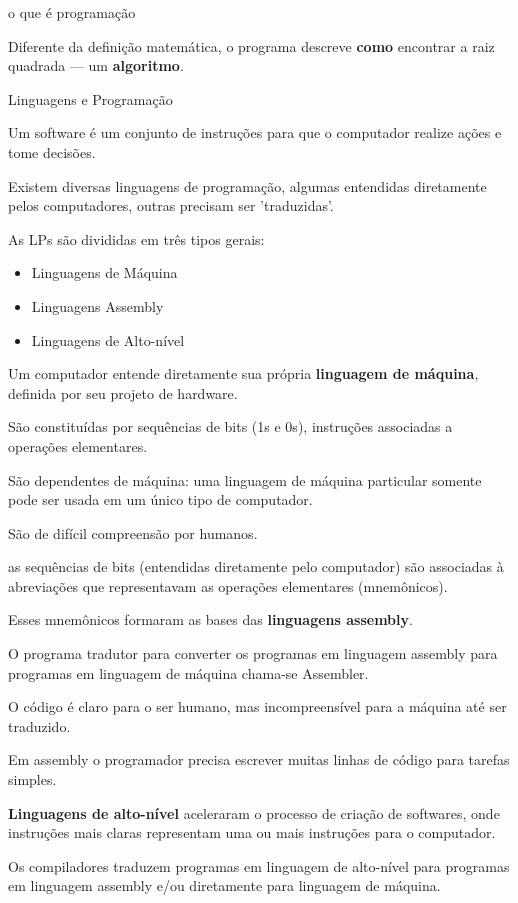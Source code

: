 \documentclass{beamer}
\begin{document}
\begin{frame}[allowframebreaks]{o que é programação}
  \framebreak

  

  Diferente da definição matemática, o programa descreve \textbf{como}
  encontrar a raiz quadrada --- um \textbf{algoritmo}.
  
\end{frame}


\begin{frame}[allowframebreaks]{Linguagens e Programação}

  Um software é um conjunto de instruções para que o computador
  realize ações e tome decisões.

  Existem diversas linguagens de programação, algumas entendidas
  diretamente pelos computadores, outras precisam ser 'traduzidas'.

  As LPs são divididas em três tipos gerais:
  
  \begin{itemize}
  \item Linguagens de Máquina
  \item Linguagens Assembly
  \item Linguagens de Alto-nível
  \end{itemize}

  \framebreak
  
  Um computador entende diretamente sua própria \textbf{linguagem de
    máquina}, definida por seu projeto de hardware.
  
  São constituídas por sequências de bits (1s e 0s), instruções
  associadas a operações elementares.
  
  São dependentes de máquina: uma linguagem de máquina particular
  somente pode ser usada em um único tipo de computador.

  São de difícil compreensão por humanos.

  \framebreak

  as sequências de bits (entendidas diretamente pelo computador) são
  associadas à abreviações que representavam as operações elementares
  (mnemônicos).
  
  Esses mnemônicos formaram as bases das \textbf{linguagens assembly}.
  
  O programa tradutor para converter os programas em linguagem
  assembly para programas em linguagem de máquina chama-se Assembler.

  O código é claro para o ser humano, mas incompreensível para a
  máquina até ser traduzido.
  
  \framebreak
  
  Em assembly o programador precisa escrever muitas linhas de código
  para tarefas simples.

  \textbf{Linguagens de alto-nível} aceleraram o processo de criação
  de softwares, onde instruções mais claras representam uma ou mais
  instruções para o computador.
  
  Os compiladores traduzem programas em linguagem de alto-nível para
  programas em linguagem assembly e/ou diretamente para linguagem de
  máquina.
  
\end{frame}
\end{document}

